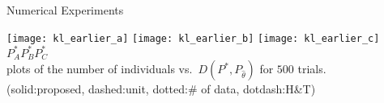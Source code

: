 \documentclass[fleqn,aspectratio=1610]{beamer}
\begin{document}
\begin{frame}[label={sec:org84b0638}]{Numerical Experiments}
\begin{center}
  \texttt{[image: kl\_earlier\_a]}
  \texttt{[image: kl\_earlier\_b]}
  \texttt{[image: kl\_earlier\_c]}
  \\
  \hspace{.07\textwidth}\(P^*_A\)\hspace{.27\textwidth}\(P^*_B\)\hspace{.27\textwidth}\(P^*_C\)
  \\[4pt]
  plots of the number of individuals vs.\ \(D(P^*,P_{\hat\theta})\) for \(500\) trials.
  \\
  (solid:proposed, dashed:unit, dotted:\# of data,  dotdash:H\&T)
\end{center}
\end{frame}
\end{document}
